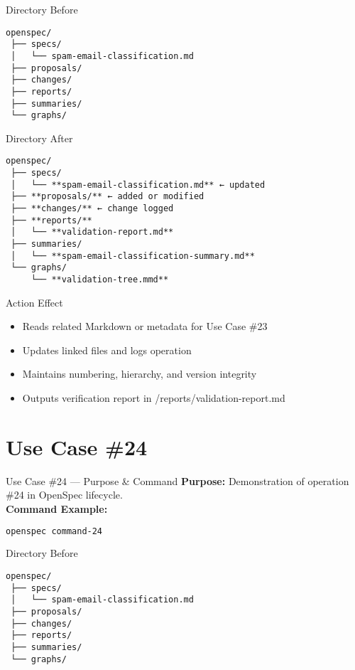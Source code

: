 \documentclass[aspectratio=169]{beamer}
\begin{document}
\begin{frame}{Directory Before}
\begin{lstlisting}
openspec/
 ├── specs/
 │   └── spam-email-classification.md
 ├── proposals/
 ├── changes/
 ├── reports/
 ├── summaries/
 └── graphs/
\end{lstlisting}
\end{frame}

\begin{frame}{Directory After}
\begin{lstlisting}
openspec/
 ├── specs/
 │   └── **spam-email-classification.md** ← updated
 ├── **proposals/** ← added or modified
 ├── **changes/** ← change logged
 ├── **reports/**
 │   └── **validation-report.md**
 ├── summaries/
 │   └── **spam-email-classification-summary.md**
 └── graphs/
     └── **validation-tree.mmd**
\end{lstlisting}
\end{frame}

\begin{frame}{Action Effect}
\begin{itemize}
  \item Reads related Markdown or metadata for Use Case \#23
  \item Updates linked files and logs operation
  \item Maintains numbering, hierarchy, and version integrity
  \item Outputs verification report in /reports/validation-report.md
\end{itemize}
\end{frame}

\section*{Use Case \#24}
\begin{frame}{Use Case \#24 --- Purpose \& Command}
\textbf{Purpose:} Demonstration of operation \#24 in OpenSpec lifecycle.\\[4pt]
\textbf{Command Example:}
\begin{lstlisting}[language=bash]
openspec command-24
\end{lstlisting}
\end{frame}

\begin{frame}{Directory Before}
\begin{lstlisting}
openspec/
 ├── specs/
 │   └── spam-email-classification.md
 ├── proposals/
 ├── changes/
 ├── reports/
 ├── summaries/
 └── graphs/
\end{lstlisting}
\end{frame}
\end{document}
